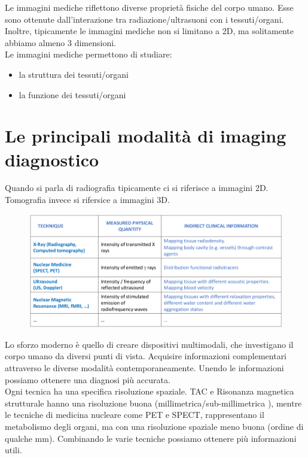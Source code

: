 Le immagini mediche riflettono diverse proprietà fisiche del corpo umano. Esse sono ottenute dall'interazione tra radiazione/ultrasuoni con i tessuti/organi.\\
Inoltre, tipicamente le immagini mediche non si limitano a 2D, ma solitamente abbiamo almeno 3 dimensioni.\\

Le immagini mediche permettono di studiare:
\begin{itemize}
	\item la struttura dei tessuti/organi
	\item la funzione dei tessuti/organi
\end{itemize}

\section{Le principali modalità di imaging diagnostico}
Quando si parla di radiografia tipicamente ci si riferisce a immagini 2D.\\
Tomografia invece si rifersice a immagini 3D.\\

\begin{figure}[ht]
	\centering
	\includegraphics[width=0.9\linewidth]{figure_med/diagnostic}
\end{figure}
\FloatBarrier

Lo sforzo moderno è quello di creare dispositivi multimodali, che investigano il corpo umano da diversi punti di vista. Acquisire informazioni complementari attraverso le diverse modalità contemporaneamente. Unendo le informazioni possiamo ottenere una diagnosi più accurata.\\
Ogni tecnica ha una specifica risoluzione spaziale. TAC e Risonanza magnetica strutturale hanno una risoluzione buona (millimetrica/sub-millimetrica ), mentre le tecniche di medicina nucleare come PET e SPECT, rappresentano il metabolismo degli organi, ma con una risoluzione spaziale meno buona (ordine di qualche mm). Combinando le varie tecniche possiamo ottenere più informazioni utili.\\
 
